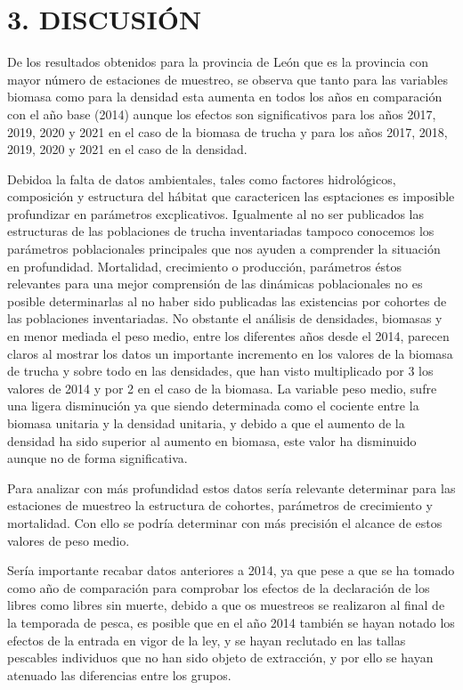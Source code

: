 \documentclass[
]{article}
\begin{document}
\hypertarget{discusiuxf3n}{%
\section{3. DISCUSIÓN}\label{discusiuxf3n}}

De los resultados obtenidos para la provincia de León que es la
provincia con mayor número de estaciones de muestreo, se observa que
tanto para las variables biomasa como para la densidad esta aumenta en
todos los años en comparación con el año base (2014) aunque los efectos
son significativos para los años 2017, 2019, 2020 y 2021 en el caso de
la biomasa de trucha y para los años 2017, 2018, 2019, 2020 y 2021 en el
caso de la densidad.

Debidoa la falta de datos ambientales, tales como factores hidrológicos,
composición y estructura del hábitat que caractericen las esptaciones es
imposible profundizar en parámetros excplicativos. Igualmente al no ser
publicados las estructuras de las poblaciones de trucha inventariadas
tampoco conocemos los parámetros poblacionales principales que nos
ayuden a comprender la situación en profundidad. Mortalidad, crecimiento
o producción, parámetros éstos relevantes para una mejor comprensión de
las dinámicas poblacionales no es posible determinarlas al no haber sido
publicadas las existencias por cohortes de las poblaciones
inventariadas. No obstante el análisis de densidades, biomasas y en
menor mediada el peso medio, entre los diferentes años desde el 2014,
parecen claros al mostrar los datos un importante incremento en los
valores de la biomasa de trucha y sobre todo en las densidades, que han
visto multiplicado por 3 los valores de 2014 y por 2 en el caso de la
biomasa. La variable peso medio, sufre una ligera disminución ya que
siendo determinada como el cociente entre la biomasa unitaria y la
densidad unitaria, y debido a que el aumento de la densidad ha sido
superior al aumento en biomasa, este valor ha disminuido aunque no de
forma significativa.

Para analizar con más profundidad estos datos sería relevante determinar
para las estaciones de muestreo la estructura de cohortes, parámetros de
crecimiento y mortalidad. Con ello se podría determinar con más
precisión el alcance de estos valores de peso medio.

Sería importante recabar datos anteriores a 2014, ya que pese a que se
ha tomado como año de comparación para comprobar los efectos de la
declaración de los libres como libres sin muerte, debido a que os
muestreos se realizaron al final de la temporada de pesca, es posible
que en el año 2014 también se hayan notado los efectos de la entrada en
vigor de la ley, y se hayan reclutado en las tallas pescables individuos
que no han sido objeto de extracción, y por ello se hayan atenuado las
diferencias entre los grupos.
\end{document}
